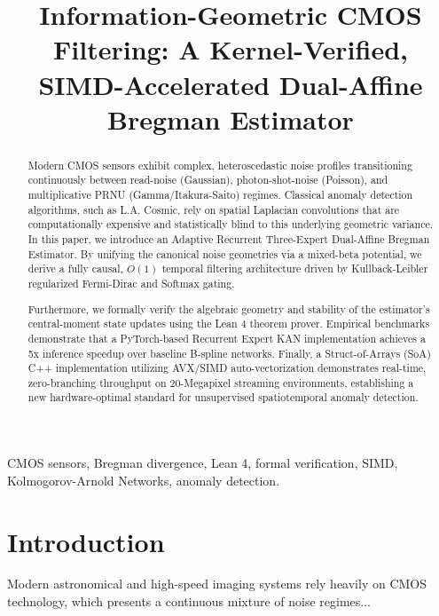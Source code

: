 \documentclass[conference]{IEEEtran}
\begin{document}
\title{Information-Geometric CMOS Filtering: A Kernel-Verified, SIMD-Accelerated Dual-Affine Bregman Estimator}

\author{
}

\maketitle

\begin{abstract}
Modern CMOS sensors exhibit complex, heteroscedastic noise profiles transitioning continuously between read-noise (Gaussian), photon-shot-noise (Poisson), and multiplicative PRNU (Gamma/Itakura-Saito) regimes. Classical anomaly detection algorithms, such as L.A. Cosmic, rely on spatial Laplacian convolutions that are computationally expensive and statistically blind to this underlying geometric variance. In this paper, we introduce an Adaptive Recurrent Three-Expert Dual-Affine Bregman Estimator. By unifying the canonical noise geometries via a mixed-beta potential, we derive a fully causal, $O(1)$ temporal filtering architecture driven by Kullback-Leibler regularized Fermi-Dirac and Softmax gating.

Furthermore, we formally verify the algebraic geometry and stability of the estimator's central-moment state updates using the Lean 4 theorem prover. Empirical benchmarks demonstrate that a PyTorch-based Recurrent Expert KAN implementation achieves a 5x inference speedup over baseline B-spline networks. Finally, a Struct-of-Arrays (SoA) C++ implementation utilizing AVX/SIMD auto-vectorization demonstrates real-time, zero-branching throughput on 20-Megapixel streaming environments, establishing a new hardware-optimal standard for unsupervised spatiotemporal anomaly detection.
\end{abstract}

\begin{IEEEkeywords}
CMOS sensors, Bregman divergence, Lean 4, formal verification, SIMD, Kolmogorov-Arnold Networks, anomaly detection.
\end{IEEEkeywords}

\section{Introduction}
Modern astronomical and high-speed imaging systems rely heavily on CMOS technology, which presents a continuous mixture of noise regimes...
\end{document}
